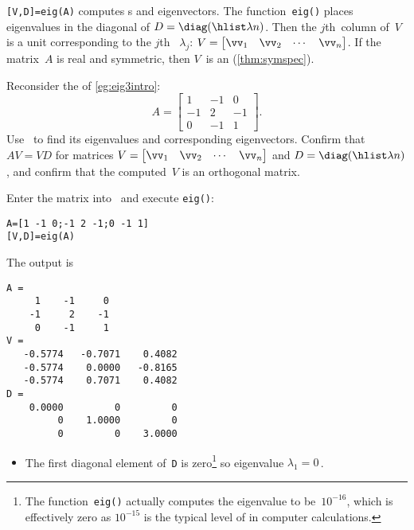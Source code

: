 \begin{compute}
\verb|[V,D]=eig(A)| computes s and eigenvectors.
The function~\verb|eig()| places eigenvalues in the diagonal of \(D=\diag(\hlist\lambda n)\). 
Then the \(j\)th~column of~\(V\) is a unit  corresponding to the \(j\)th ~\(\lambda_j\):
\(V=\begin{bmatrix} \vv_1&\vv_2&\cdots&\vv_n \end{bmatrix}\).
If the matrix~\(A\) is real and symmetric, then \(V\)~is an  (\cref{thm:symspec}).
\end{compute}

\begin{example} \label{eg:eig3eig}
Reconsider the  of \cref{eg:eig3intro}:
\begin{equation*}
A=\begin{bmatrix} 1&-1&0\\-1&2&-1\\0&-1&1 \end{bmatrix}.
\end{equation*}
Use \script\ to find its eigenvalues and corresponding eigenvectors.
Confirm that \(AV=VD\) for matrices \(V=\begin{bmatrix} \vv_1&\vv_2&\cdots&\vv_n \end{bmatrix}\) and \(D=\diag(\hlist\lambda n)\), and confirm that the computed~\(V\) is an orthogonal matrix.
\begin{solution} 
Enter the matrix into \script\ and execute \verb|eig()|:
\setbox\ajrqrbox\hbox{}%
\marginajrbox%
\begin{verbatim}
A=[1 -1 0;-1 2 -1;0 -1 1]
[V,D]=eig(A)
\end{verbatim}
The output is
\begin{verbatim}
A =
     1    -1     0
    -1     2    -1
     0    -1     1
V =
   -0.5774   -0.7071    0.4082
   -0.5774    0.0000   -0.8165
   -0.5774    0.7071    0.4082
D =
    0.0000         0         0
         0    1.0000         0
         0         0    3.0000
\end{verbatim}
\begin{itemize}
\item The first diagonal element of~\verb|D| is zero\footnote{The function~\texttt{eig()} actually computes the eigenvalue to be~\(10^{-16}\), which is effectively zero as \(10^{-15}\) is the typical level of  in computer calculations.} so eigenvalue \(\lambda_1=0\)\,.

\end{itemize}
\end{solution}
\end{example}
